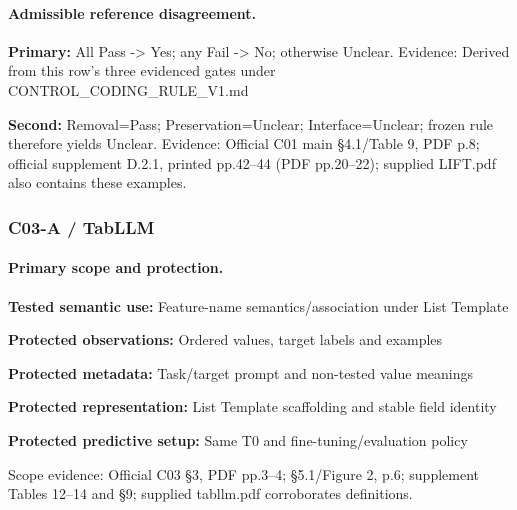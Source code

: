 \documentclass[10pt]{article}
\begin{document}
\paragraph{Admissible reference disagreement.}
\textbf{Primary:} All Pass -> Yes; any Fail -> No; otherwise Unclear. Evidence: Derived from this row’s three evidenced gates under CONTROL\_CODING\_RULE\_V1.md\par
\textbf{Second:} Removal=Pass; Preservation=Unclear; Interface=Unclear; frozen rule therefore yields Unclear. Evidence: Official C01 main §4.1/Table 9, PDF p.8; official supplement D.2.1, printed pp.42--44 (PDF pp.20--22); supplied LIFT.pdf also contains these examples.\par
\subsubsection*{C03-A / TabLLM}
\paragraph{Primary scope and protection.}
\textbf{Tested semantic use:} Feature-name semantics/association under List Template\par
\textbf{Protected observations:} Ordered values, target labels and examples\par
\textbf{Protected metadata:} Task/target prompt and non-tested value meanings\par
\textbf{Protected representation:} List Template scaffolding and stable field identity\par
\textbf{Protected predictive setup:} Same T0 and fine-tuning/evaluation policy\par
Scope evidence: Official C03 §3, PDF pp.3--4; §5.1/Figure 2, p.6; supplement Tables 12--14 and §9; supplied tabllm.pdf corroborates definitions.\par
\end{document}
